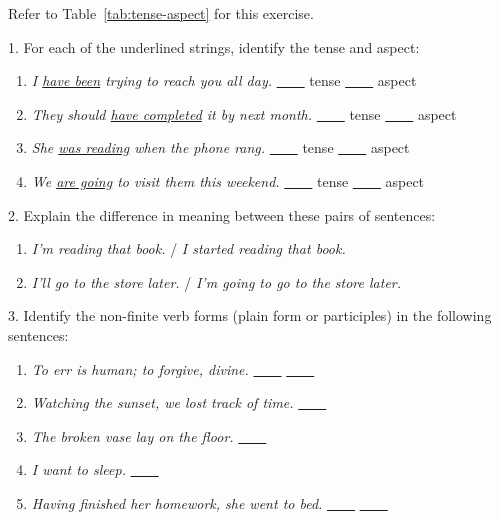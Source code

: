 \begin{tcolorbox}[title=Exercise: The English tense/aspect system, colback=white, colframe=blue!75!black, fonttitle=\bfseries]

Refer to Table~\ref{tab:tense-aspect} for this exercise.

1. For each of the underlined strings, identify the tense and aspect:

   \begin{enumerate}[nosep]
      \item \textit{I \uline{have been} trying to reach you all day.} \hfill\uline{~~~~} tense \uline{~~~~} aspect
      \item \textit{They should \uline{have completed} it by next month.} \hfill\uline{~~~~} tense \uline{~~~~} aspect
      \item \textit{She \uline{was reading} when the phone rang.} \hfill\uline{~~~~} tense \uline{~~~~} aspect
      \item \textit{We \uline{are going} to visit them this weekend.} \hfill\uline{~~~~} tense \uline{~~~~} aspect
   \end{enumerate}

2. Explain the difference in meaning between these pairs of sentences:

   \begin{enumerate}[nosep]
      \item \textit{I'm reading that book.} / \textit{I started reading that book.}
      \item \textit{I'll go to the store later.} / \textit{I'm going to go to the store later.}
   \end{enumerate}

3. Identify the non-finite verb forms (plain form or participles) in the following sentences:

   \begin{enumerate}[nosep]
      \item \textit{To err is human; to forgive, divine.} \hfill\uline{~~~~} \uline{~~~~}
      \item \textit{Watching the sunset, we lost track of time.} \hfill\uline{~~~~}
      \item \textit{The broken vase lay on the floor.} \hfill\uline{~~~~}
      \item \textit{I want to sleep.} \hfill\uline{~~~~}
      \item \textit{Having finished her homework, she went to bed.} \hfill\uline{~~~~} \uline{~~~~}
   \end{enumerate}

\end{tcolorbox}

